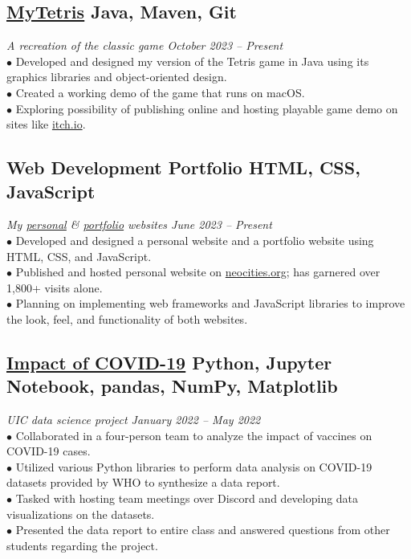 \documentclass{article}
\begin{document}
\subsection{\href{https://github.com/IanLulu/MyTetris}{\underline{MyTetris}} \hfill \textnormal{Java, Maven, Git}}
\vspace{-0.5em}
\textit{A recreation of the classic game \hfill October 2023 -- Present}
\\
$\bullet$ Developed and designed my version of the Tetris game in Java using its graphics libraries and object-oriented design.
\\
$\bullet$ Created a working demo of the game that runs on macOS.
\\
$\bullet$ Exploring possibility of publishing online and hosting playable game demo on sites like \url{itch.io}.
\vspace{-0.5em}

\subsection{Web Development Portfolio \hfill \textnormal{HTML, CSS, JavaScript}}
\vspace{-0.5em}
\textit{My \href{https://github.com/IanLulu/neocities-website}{\underline{personal}} \& \href{https://github.com/IanLulu/ianlulu.github.io}{\underline{portfolio}} websites \hfill June 2023 -- Present}
\\
$\bullet$ Developed and designed a personal website and a portfolio website using HTML, CSS, and JavaScript.
\\
$\bullet$ Published and hosted personal website on \url{neocities.org}; has garnered over 1,800+ visits alone.
\\
$\bullet$ Planning on implementing web frameworks and JavaScript libraries to improve the look, feel, and functionality of both websites.
\vspace{-0.5em}

\subsection{\href{https://github.com/uic-cs418/cs418-spring22-the-wild-card}{\underline{Impact of COVID-19}} \hfill \textnormal{Python, Jupyter Notebook, pandas, NumPy, Matplotlib}}
\vspace{-0.5em}
\textit{UIC data science project \hfill January 2022 -- May 2022}
\\
$\bullet$ Collaborated in a four-person team to analyze the impact of vaccines on COVID-19 cases.
\\
$\bullet$ Utilized various Python libraries to perform data analysis on COVID-19 datasets provided by WHO to synthesize a data report.
\\
$\bullet$ Tasked with hosting team meetings over Discord and developing data visualizations on the datasets.
\\
$\bullet$ Presented the data report to entire class and answered questions from other students regarding the project.
\end{document}
